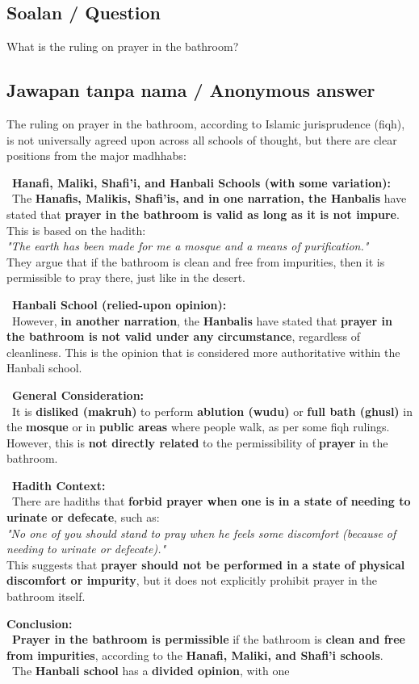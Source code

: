 \documentclass[11pt,a4paper]{article}
\begin{document}
\subsection*{Soalan / Question}
What is the ruling on prayer in the bathroom?

\subsection*{Jawapan tanpa nama / Anonymous answer}
The ruling on prayer in the bathroom, according to Islamic jurisprudence (fiqh), is not universally agreed upon across all schools of thought, but there are clear positions from the major madhhabs:\par\medskip \textbullet\ \textbf{Hanafi, Maliki, Shafi'i, and Hanbali Schools (with some variation):}\\ \textbullet\ The \textbf{Hanafis, Malikis, Shafi'is, and in one narration, the Hanbalis} have stated that \textbf{prayer in the bathroom is valid as long as it is not impure}. This is based on the hadith:\\ \emph{"The earth has been made for me a mosque and a means of purification."}\\ They argue that if the bathroom is clean and free from impurities, then it is permissible to pray there, just like in the desert.\par\medskip \textbullet\ \textbf{Hanbali School (relied-upon opinion):}\\ \textbullet\ However, \textbf{in another narration}, the \textbf{Hanbalis} have stated that \textbf{prayer in the bathroom is not valid under any circumstance}, regardless of cleanliness. This is the opinion that is considered more authoritative within the Hanbali school.\par\medskip \textbullet\ \textbf{General Consideration:}\\ \textbullet\ It is \textbf{disliked (makruh)} to perform \textbf{ablution (wudu)} or \textbf{full bath (ghusl)} in the \textbf{mosque} or in \textbf{public areas} where people walk, as per some fiqh rulings. However, this is \textbf{not directly related} to the permissibility of \textbf{prayer} in the bathroom.\par\medskip \textbullet\ \textbf{Hadith Context:}\\ \textbullet\ There are hadiths that \textbf{forbid prayer when one is in a state of needing to urinate or defecate}, such as:\\ \emph{"No one of you should stand to pray when he feels some discomfort (because of needing to urinate or defecate)."}\\ This suggests that \textbf{prayer should not be performed in a state of physical discomfort or impurity}, but it does not explicitly prohibit prayer in the bathroom itself.\par\medskip \textbf{Conclusion:}\\ \textbullet\ \textbf{Prayer in the bathroom is permissible} if the bathroom is \textbf{clean and free from impurities}, according to the \textbf{Hanafi, Maliki, and Shafi'i schools}.\\ \textbullet\ The \textbf{Hanbali school} has a \textbf{divided opinion}, with one 
\end{document}
